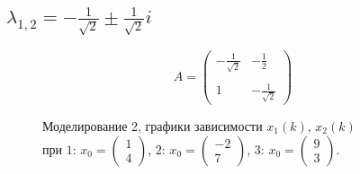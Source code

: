 \documentclass[a5paper, 10pt]{article}
\theoremstyle{definition}
\theoremstyle{plain}
\theoremstyle{remark}
\begin{document}
\subsection{$\lambda_{1, 2} = -\frac{1}{\sqrt{2}} \pm \frac{1}{\sqrt{2}} i$}
\begin{equation}
A =
\begin{pmatrix}
-\frac{1}{\sqrt{2}} & -\frac{1}{2} \\
\\
1 & -\frac{1}{\sqrt{2}}
\end{pmatrix}
\end{equation}
\begin{figure}[h!]
\caption{Моделирование 2, графики зависимости $x_1 \left( k \right), \, x_2 \left( k \right)$ \\ при  $1: \, x_0 = \begin{pmatrix} 1 \\ 4 \end{pmatrix}$, $2: \, x_0 = \begin{pmatrix} -2 \\ 7 \end{pmatrix}$, $3: \, x_0 = \begin{pmatrix} 9 \\ 3 \end{pmatrix}$.}
\end{figure}


\end{document}
